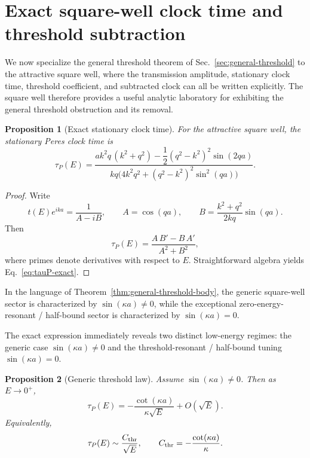 \documentclass[aps,pra,preprint,notitlepage,nofootinbib]{revtex4-2}
\newtheorem{proposition}{Proposition}
\begin{document}
\section{Exact square-well clock time and threshold subtraction}
\label{sec:squarewell}

We now specialize the general threshold theorem of Sec.~\ref{sec:general-threshold} to the attractive square well, where the transmission amplitude, stationary clock time, threshold coefficient, and subtracted clock can all be written explicitly. The square well therefore provides a useful analytic laboratory for exhibiting the general threshold obstruction and its removal.

\begin{proposition}[Exact stationary clock time]
For the attractive square well, the stationary Peres clock time is
\begin{equation}
\tau_P(E)=
\frac{
 a k^2 q\,(k^2+q^2)-\dfrac12 (q^2-k^2)^2\sin(2qa)
}{
 kq\Big(4k^2q^2+(q^2-k^2)^2\sin^2(qa)\Big)
}.
\label{eq:tauP-exact}
\end{equation}
\end{proposition}

\begin{proof}
Write
\begin{equation}
t(E)e^{ika}=\frac{1}{A-iB},
\qquad
A=\cos(qa),
\qquad
B=\frac{k^2+q^2}{2kq}\sin(qa).
\end{equation}
Then
\begin{equation}
\tau_P(E)=\frac{A\,B'-B\,A'}{A^2+B^2},
\end{equation}
where primes denote derivatives with respect to $E$. Straightforward algebra yields Eq.~\eqref{eq:tauP-exact}.
\end{proof}

In the language of Theorem~\ref{thm:general-threshold-body}, the generic square-well sector is characterized by $\sin(\kappa a)\neq 0$, while the exceptional zero-energy-resonant / half-bound sector is characterized by $\sin(\kappa a)=0$.

The exact expression immediately reveals two distinct low-energy regimes: the generic case $\sin(\kappa a)\neq 0$ and the threshold-resonant / half-bound tuning $\sin(\kappa a)=0$.

\begin{proposition}[Generic threshold law]
Assume $\sin(\kappa a)\neq 0$. Then as $E\to0^+$,
\begin{equation}
\tau_P(E)=
-\frac{\cot(\kappa a)}{\kappa\sqrt{E}}
+O(\sqrt{E}).
\label{eq:tauP-threshold}
\end{equation}
Equivalently,
\begin{equation}
\tau_P(E)\sim \frac{C_{\rm thr}}{\sqrt{E}},
\qquad
C_{\rm thr}=-\frac{\cot(\kappa a)}{\kappa}.
\label{eq:Cthr-def}
\end{equation}
\end{proposition}
\end{document}
